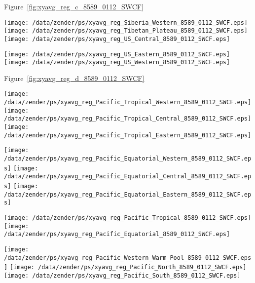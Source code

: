 \documentclass[agupp]{aguplus}
\begin{document}
Figure~\ref{fig:xyavg_reg_c_8589_0112_SWCF}
\begin{figure*}
\texttt{[image: /data/zender/ps/xyavg\_reg\_Siberia\_Western\_8589\_0112\_SWCF.eps]}%
\texttt{[image: /data/zender/ps/xyavg\_reg\_Tibetan\_Plateau\_8589\_0112\_SWCF.eps]}%
\texttt{[image: /data/zender/ps/xyavg\_reg\_US\_Central\_8589\_0112\_SWCF.eps]}%

\texttt{[image: /data/zender/ps/xyavg\_reg\_US\_Eastern\_8589\_0112\_SWCF.eps]}%
\texttt{[image: /data/zender/ps/xyavg\_reg\_US\_Western\_8589\_0112\_SWCF.eps]}%

\caption{Seasonal amplitude in regional shortwave cloud
forcing (\wxmS ) for ERBE, CCM, and ANV. Month 1 is January. 
\label{fig:xyavg_reg_c_8589_0112_SWCF}}   
\end{figure*}

Figure~\ref{fig:xyavg_reg_d_8589_0112_SWCF}
\begin{figure*}
\texttt{[image: /data/zender/ps/xyavg\_reg\_Pacific\_Tropical\_Western\_8589\_0112\_SWCF.eps]}%
\texttt{[image: /data/zender/ps/xyavg\_reg\_Pacific\_Tropical\_Central\_8589\_0112\_SWCF.eps]}%
\texttt{[image: /data/zender/ps/xyavg\_reg\_Pacific\_Tropical\_Eastern\_8589\_0112\_SWCF.eps]}%

\texttt{[image: /data/zender/ps/xyavg\_reg\_Pacific\_Equatorial\_Western\_8589\_0112\_SWCF.eps]}%
\texttt{[image: /data/zender/ps/xyavg\_reg\_Pacific\_Equatorial\_Central\_8589\_0112\_SWCF.eps]}%
\texttt{[image: /data/zender/ps/xyavg\_reg\_Pacific\_Equatorial\_Eastern\_8589\_0112\_SWCF.eps]}%

\texttt{[image: /data/zender/ps/xyavg\_reg\_Pacific\_Tropical\_8589\_0112\_SWCF.eps]}%
\texttt{[image: /data/zender/ps/xyavg\_reg\_Pacific\_Equatorial\_8589\_0112\_SWCF.eps]}%

\texttt{[image: /data/zender/ps/xyavg\_reg\_Pacific\_Western\_Warm\_Pool\_8589\_0112\_SWCF.eps]}%
\texttt{[image: /data/zender/ps/xyavg\_reg\_Pacific\_North\_8589\_0112\_SWCF.eps]}%
\texttt{[image: /data/zender/ps/xyavg\_reg\_Pacific\_South\_8589\_0112\_SWCF.eps]}%

\caption{Seasonal amplitude in regional shortwave cloud
forcing (\wxmS ) for ERBE, CCM, and ANV. Month 1 is January. 
\label{fig:xyavg_reg_d_8589_0112_SWCF}}   
\end{figure*}

\end{document}
